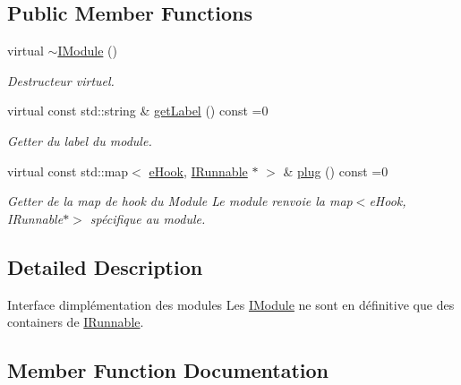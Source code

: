 \subsection*{Public Member Functions}
\begin{DoxyCompactItemize}
\item 
\hypertarget{class_a_p_i_tree_friends_1_1_i_module_aa22ef80601340718cee4f78eec47b9ba}{}virtual \hyperlink{class_a_p_i_tree_friends_1_1_i_module_aa22ef80601340718cee4f78eec47b9ba}{$\sim$\+I\+Module} ()\label{class_a_p_i_tree_friends_1_1_i_module_aa22ef80601340718cee4f78eec47b9ba}

\begin{DoxyCompactList}\small\item\em Destructeur virtuel. \end{DoxyCompactList}\item 
virtual const std\+::string \& \hyperlink{class_a_p_i_tree_friends_1_1_i_module_a47ffe9b3988e2f608687cdf3d9e4210e}{get\+Label} () const =0
\begin{DoxyCompactList}\small\item\em Getter du label du module. \end{DoxyCompactList}\item 
virtual const std\+::map$<$ \hyperlink{namespace_a_p_i_tree_friends_a3943902c0fe96b820b0261e510dcb720}{e\+Hook}, \hyperlink{class_a_p_i_tree_friends_1_1_i_runnable}{I\+Runnable} $\ast$ $>$ \& \hyperlink{class_a_p_i_tree_friends_1_1_i_module_a9efbed18c7d4b44ee8c455a39e997cea}{plug} () const =0
\begin{DoxyCompactList}\small\item\em Getter de la map de hook du Module Le module renvoie la map$<$e\+Hook, I\+Runnable$\ast$$>$ spécifique au module. \end{DoxyCompactList}\end{DoxyCompactItemize}


\subsection{Detailed Description}
Interface d\textquotesingle{}implémentation des modules Les \hyperlink{class_a_p_i_tree_friends_1_1_i_module}{I\+Module} ne sont en définitive que des containers de \hyperlink{class_a_p_i_tree_friends_1_1_i_runnable}{I\+Runnable}. 

\subsection{Member Function Documentation}
\hypertarget{class_a_p_i_tree_friends_1_1_i_module_a47ffe9b3988e2f608687cdf3d9e4210e}{}
